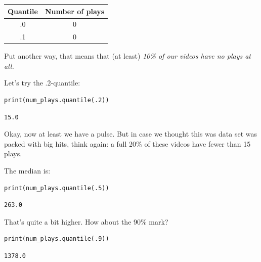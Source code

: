 \begin{center}
\renewcommand{\arraystretch}{.7}
\begingroup
\par\tagpdfparaOff
{}
\begin{tabular}{c|c}
Quantile & Number of plays \\
\hline
.0 & 0 \\
.1 & 0 \\
\end{tabular}\par
\endgroup
\end{center}

Put another way, that means that (at least) \textit{10\% of our videos have no
plays at all.}

Let's try the .2-quantile:

\begin{Verbatim}[fontsize=\small,samepage=true,frame=single,framesep=3mm]
print(num_plays.quantile(.2))
\end{Verbatim}
\vspace{-.3in}

\begin{Verbatim}[fontsize=\small,samepage=true,frame=leftline,framesep=5mm,framerule=1mm]
15.0
\end{Verbatim}

Okay, now at least we have a pulse. But in case we thought this was data set
was packed with big hits, think again: a full 20\% of these videos have fewer
than 15 plays.

The median is:

\begin{Verbatim}[fontsize=\small,samepage=true,frame=single,framesep=3mm]
print(num_plays.quantile(.5))
\end{Verbatim}
\vspace{-.3in}

\begin{Verbatim}[fontsize=\small,samepage=true,frame=leftline,framesep=5mm,framerule=1mm]
263.0
\end{Verbatim}

That's quite a bit higher. How about the 90\% mark?

\begin{Verbatim}[fontsize=\small,samepage=true,frame=single,framesep=3mm]
print(num_plays.quantile(.9))
\end{Verbatim}
\vspace{-.3in}

\begin{Verbatim}[fontsize=\small,samepage=true,frame=leftline,framesep=5mm,framerule=1mm]
1378.0
\end{Verbatim}

